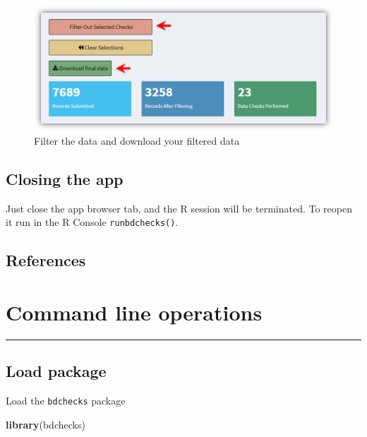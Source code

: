 \documentclass[]{book}
\newenvironment{Shaded}{\begin{snugshade}}{\end{snugshade}}
\newcommand{\KeywordTok}[1]{\textcolor[rgb]{0.13,0.29,0.53}{\textbf{#1}}}
\newcommand{\NormalTok}[1]{#1}
\theoremstyle{definition}
\theoremstyle{definition}
\theoremstyle{definition}
\theoremstyle{remark}
\begin{document}
\begin{figure}
\centering
\includegraphics{img/bdchecks_filtering_action.png}
\caption{Filter the data and download your filtered data}
\end{figure}

\section{Closing the app}\label{closing-the-app}

Just close the app browser tab, and the R session will be terminated. To
reopen it run in the R Console \texttt{runbdchecks()}.

\section{References}\label{references}

\hypertarget{command-line-operations}{\chapter{Command line
operations}\label{command-line-operations}}

\begin{center}\rule{0.5\linewidth}{\linethickness}\end{center}

\section{Load package}\label{load-package}

Load the \texttt{bdchecks} package

\begin{Shaded}
\begin{Highlighting}[]
    \KeywordTok{library}\NormalTok{(bdchecks)}
\end{Highlighting}
\end{Shaded}
\end{document}
